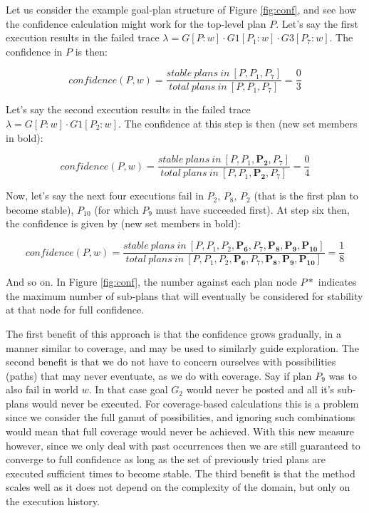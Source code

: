 \documentclass[a4paper]{article}
\begin{document}
Let us consider the example goal-plan structure of Figure \ref{fig:conf}, and see how the confidence calculation might work for the top-level plan $P$. Let's say the first execution results in the failed trace $\lambda=G[P:w] \cdot G1[P_1:w] \cdot G3[P_7:w]$. The confidence in $P$ is then:

\begin{equation}
confidence(P,w)=\frac{stable~plans~in~[P,P_1,P_7]}{total~plans~in~[P,P_1,P_7]} = \frac{0}{3}
\end{equation}

Let's say the second execution results in the failed trace $\lambda=G[P:w] \cdot G1[P_2:w]$. The confidence at this step is then (new set members in bold):

\begin{equation}
confidence(P,w)=\frac{stable~plans~in~[P,P_1,\boldsymbol{P_2},P_7]}{total~plans~in~[P,P_1,\boldsymbol{P_2},P_7]} = \frac{0}{4}
\end{equation}

Now, let's say the next four executions fail in $P_2$, $P_8$, $P_2$ (that is the first plan to become stable), $P_{10}$ (for which $P_9$ must have succeeded first). At step six then, the confidence is given by (new set members in bold):

\begin{equation}
confidence(P,w)=\frac{stable~plans~in~[P,P_1,P_2, \boldsymbol{P_6},P_7,\boldsymbol{P_8},\boldsymbol{P_9},\boldsymbol{P_{10}}]}{total~plans~in~[P,P_1,P_2, \boldsymbol{P_6},P_7,\boldsymbol{P_8},\boldsymbol{P_9},\boldsymbol{P_{10}}]} = \frac{1}{8}
\label{eqn:conf3}
\end{equation}

And so on. In Figure \ref{fig:conf}, the number against each plan node $P*$ indicates the maximum number of sub-plans that will eventually be considered for stability at that node for full confidence. 

The first benefit of this approach is that the confidence grows gradually, in a manner similar to coverage, and may be used to similarly guide exploration. The second benefit is that we do not have to concern ourselves with possibilities (paths) that may never eventuate, as we do with coverage. Say if plan $P_9$ was to also fail in world $w$. In that case goal $G_2$ would never be posted and all it's sub-plans would never be executed. For coverage-based calculations this is a problem since we consider the full gamut of possibilities, and ignoring such combinations would mean that full coverage would never be achieved. With this new measure however, since we only deal with past occurrences then we are still guaranteed to converge to full confidence as long as the set of previously tried plans are executed sufficient times to become stable. The third benefit is that the method scales well as it does not depend on the complexity of the domain, but only on the execution history.
\end{document}
